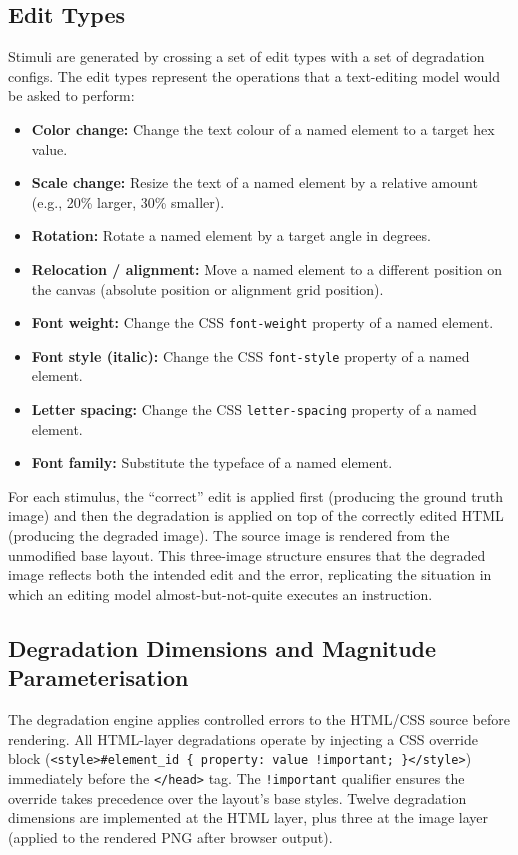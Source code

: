 \subsection{Edit Types} \label{Edit Types}

Stimuli are generated by crossing a set of edit types with a set of degradation configs. The edit types represent the operations that a text-editing model would be asked to perform:

\begin{itemize}
    \item \textbf{Color change:} Change the text colour of a named element to a target hex value.
    \item \textbf{Scale change:} Resize the text of a named element by a relative amount (e.g., 20\% larger, 30\% smaller).
    \item \textbf{Rotation:} Rotate a named element by a target angle in degrees.
    \item \textbf{Relocation / alignment:} Move a named element to a different position on the canvas (absolute position or alignment grid position).
    \item \textbf{Font weight:} Change the CSS \texttt{font-weight} property of a named element.
    \item \textbf{Font style (italic):} Change the CSS \texttt{font-style} property of a named element.
    \item \textbf{Letter spacing:} Change the CSS \texttt{letter-spacing} property of a named element.
    \item \textbf{Font family:} Substitute the typeface of a named element.
\end{itemize}

For each stimulus, the ``correct'' edit is applied first (producing the ground truth image) and then the degradation is applied on top of the correctly edited HTML (producing the degraded image). The source image is rendered from the unmodified base layout. This three-image structure ensures that the degraded image reflects both the intended edit and the error, replicating the situation in which an editing model almost-but-not-quite executes an instruction.

\subsection{Degradation Dimensions and Magnitude Parameterisation} \label{Degradation Dimensions}

The degradation engine applies controlled errors to the HTML/CSS source before rendering. All HTML-layer degradations operate by injecting a CSS override block (\texttt{<style>\#element\_id \{ property: value !important; \}</style>}) immediately before the \texttt{</head>} tag. The \texttt{!important} qualifier ensures the override takes precedence over the layout's base styles. Twelve degradation dimensions are implemented at the HTML layer, plus three at the image layer (applied to the rendered PNG after browser output).

